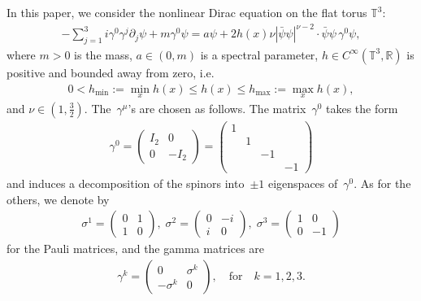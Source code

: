\documentclass[11pt,final]{amsart}
\newcommand{\T}{\mathbb{T}}
\begin{document}
In this paper, we consider the nonlinear Dirac equation on the flat torus $\T^3$:
\begin{align}\label{eq:NDE-spatial}
-\sum_{j=1}^3 i\gamma^0\gamma^j\partial_j\psi + m\gamma^0\psi
= a\psi + 2h(x)\nu |\bar{\psi}\psi|^{\nu-2}\cdot \bar{\psi}\psi\,\gamma^0\psi,
\end{align}
where $m>0$ is the mass, $a\in(0,m)$ is a spectral parameter, $h\in C^\infty(\T^3,\mathbb{R})$ is positive and bounded away from zero, i.e.
\begin{align}
0<h_{\min}:=\min_{x}h(x)\leq h(x)\leq h_{\max}:=\max_{x}h(x),
\end{align}
and $\nu\in(1,\frac{3}{2})$. The~$\gamma^\mu$'s are chosen as follows. The matrix~$\gamma^0$ takes the form
\begin{align}
    \gamma^0= \begin{pmatrix} I_2 & 0 \\ 0 & -I_2\end{pmatrix}
    =\begin{pmatrix}
        1 & & &  \\ & 1 & & \\ & & -1 & \\ & &  & -1
    \end{pmatrix}
\end{align}
and induces a decomposition of the spinors into~$\pm1$ eigenspaces of~$\gamma^0$.
As for the others, we denote by
\begin{align}
    {\sigma^1} = \left( {\begin{array}{*{20}{c}}
			{0}&1 \\
			1&{0}
	\end{array}} \right),\;{\sigma^2} = \left( {\begin{array}{*{20}{c}}
			{0}&{ - i} \\
			i&{0}
	\end{array}} \right),\;{\sigma^3} = \left( {\begin{array}{*{20}{c}}
			1&{0} \\
			{0}&{ - 1}
	\end{array}} \right)
\end{align}
for the Pauli matrices, and the gamma matrices are
\begin{align}
    {\gamma^k} = \left( {\begin{array}{*{20}{c}}
			{0}&{{\sigma^k}} \\
			{{-\sigma^k}}&{0}
	\end{array}} \right),\quad\text{for}\quad k= 1, 2, 3.
\end{align}
\end{document}
